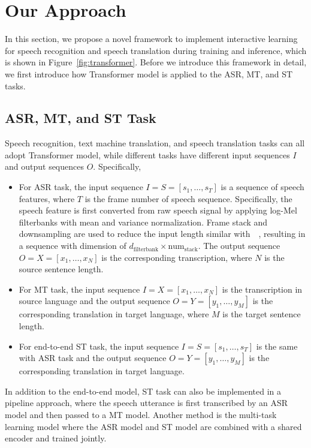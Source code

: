\documentclass[letterpaper]{article} %
\begin{document}
\section{Our Approach}
In this section, we propose a novel framework to implement interactive learning for speech recognition and speech translation during training and inference, which is shown in Figure~\ref{fig:transformer}. Before we introduce this framework in detail, we first introduce how Transformer model is applied to the ASR, MT, and ST tasks.

\subsection{ASR, MT, and ST Task}
Speech recognition, text machine translation, and speech translation tasks can all adopt Transformer model, while different tasks have different input sequences $\mathbf{\mathit{I}}$ and output sequences $\mathbf{\mathit{O}}$. Specifically,
\begin{itemize}
\item For ASR task, the input sequence $\mathbf{\mathit{I}}=\mathbf{\mathit{S}}=[s_1,\dots,s_T]$ is a sequence of speech features, where $T$ is the frame number of speech sequence. Specifically, the speech feature is first converted from raw speech signal by applying log-Mel filterbanks with mean and variance normalization. Frame stack and downsampling are used  to reduce the input length similar with~\citeauthor{sak2015fast}~, resulting in a sequence with dimension of $d_{\textrm{filterbank}} \times \textrm{num}_{\textrm{stack}}$.
The output sequence $\mathbf{\mathit{O}}=\mathbf{\mathit{X}}=[x_1,\dots,x_N]$ is the corresponding transcription, where $N$ is the source sentence length.
\item For  MT task, the input sequence $\mathbf{\mathit{I}}=\mathbf{\mathit{X}}=[x_1,\dots,x_N]$ is  the transcription in source language and the output sequence $\mathbf{\mathit{O}}=\mathbf{\mathit{Y}}=[y_1,\dots,y_M]$ is the corresponding translation in target language, where $M$ is the target sentence length.
\item For end-to-end ST task, the input sequence $\mathbf{\mathit{I}}=\mathbf{\mathit{S}}=[s_1,\dots,s_T]$ is the same with ASR task and the output sequence $\mathbf{\mathit{O}}=\mathbf{\mathit{Y}}=[y_1,\dots,y_M]$ is the corresponding translation in target language.
\end{itemize}

In addition to the end-to-end model, ST task can also be implemented in a pipeline approach, where the speech utterance is first transcribed by an ASR model and then passed to a MT model. Another method is the multi-task learning model where the ASR model and ST model are combined with a shared encoder and trained jointly.
\end{document}
